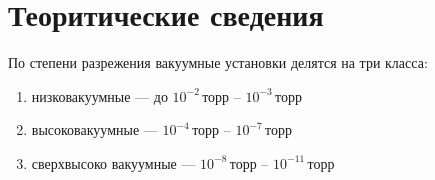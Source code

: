 \section{Теоритические сведения}
По степени разрежения вакуумные установки делятся на три класса:
\begin{enumerate}
    \item низковакуумные --- до $10^{-2}\,\text{торр}$ -- $10^{-3}\,\text{торр}$
    \item высоковакуумные --- $10^{-4}\,\text{торр}$ -- $10^{-7}\,\text{торр}$
    \item сверхвысоко вакуумные --- $10^{-8}\,\text{торр}$ -- $10^{-11}\,\text{торр}$
\end{enumerate}